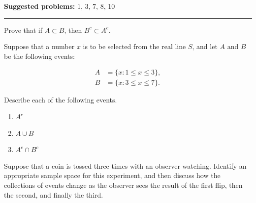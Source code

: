 \documentclass[12pt,reqno]{amsart}
\begin{document}
\textbf{Suggested problems:} 1, 3, 7, 8, 10

\bigskip
\hrule

\bigskip

\prob Prove that if $A\subset B$, then $B^c \subset A^c$.

\vfill
\prob Suppose that a number $x$ is to be selected from the real line $S$, and let $A$ and $B$ be the following events:

\begin{align*}
A &= \{x : 1\leq x \leq 3\}, \\
B &= \{ x : 3 \leq x \leq 7 \}.
\end{align*}

Describe each of the following events.

\begin{enumerate}
\item $A^c$\vfill
\item $A \cup B$\vfill
\item $A^c \cap B^c$\vfill
\end{enumerate}

\newpage
\prob Suppose that a coin is tossed three times with an observer watching. Identify an appropriate sample space for this experiment, and then discuss how the collections of events change as the observer sees the result of the first flip, then the second, and finally the third.
\end{document}

